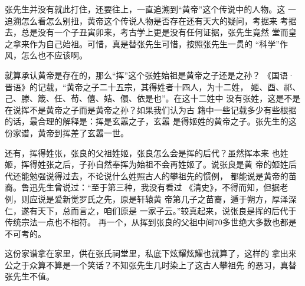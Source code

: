 张先生并没有就此打住，还要往上，一直追溯到“黄帝”这个传说中的人物。这
一追溯怎么看怎么别扭，黄帝这个传说人物是否存在还有天大的疑问，考据来
考据去，总是没有一个子丑寅卯来，考古学上更是没有任何证据，张先生竟然
堂而皇之拿来作为自己始祖。可惜，真是替张先生可惜，按照张先生一贯的
“科学”作风，怎么也不应该啊。

就算承认黄帝是存在的，那么“挥”这个张姓始祖是黄帝之子还是之孙？
《国语·晋语》的记载，“黄帝之子二十五宗，其得姓者十四人，为十二姓，
姬、酉、祁、己、滕、箴、任、荀、僖、姞、儇、依是也”。在这十二姓中
没有张姓，这是不是在说挥不是黄帝之子而是黄帝之孙？如果我们认为古
籍中一些记载多少有些根据的话，最合理的解释是：挥是玄嚣之子，玄嚣
是得姬姓的黄帝之子。张先生的这份家谱，黄帝到挥差了玄嚣一世。

还有，挥得姓张，张良的父祖姓姬，张良怎么会是挥的后代？虽然挥本来
也姓姬，挥得姓张之后，子孙自然奉挥为始祖不会再姓姬了。说张良是黄
帝的姬姓后代还能勉强说得过去，不论说什么姓照古人的攀祖先的惯例，
都能说是黄帝的苗裔。鲁迅先生曾说过：“至于第三种，我没有看过
《清史》，不得而知，但据老例，则应说是爱新觉罗氏之先，原是轩辕黄
帝第几子之苗裔，遁于朔方，厚泽深仁，遂有天下，总而言之，咱们原是
一家子云。”较真起来，说张良是挥的后代于传统宗法一点也不相符。
再一个，从挥到张良的父祖中间70多世绝大多数也都是不可考的。

这份家谱拿在家里，供在张氏祠堂里，私底下炫耀炫耀也就算了，这样的
拿出来公之于众算不算是一个笑话？不知张先生几时染上了这古人攀祖先
的恶习，真替张先生不值。
